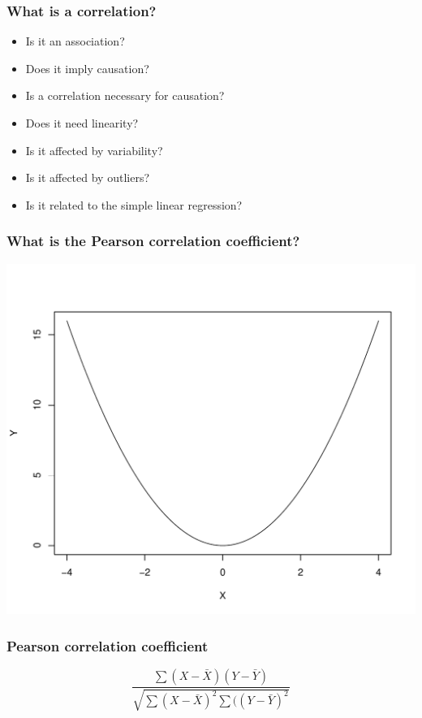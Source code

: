 \documentclass[dvipsnames]{beamer}\usepackage[]{graphicx}\usepackage[]{color}
\makeatletter
\def\maxwidth{ %
  \ifdim\Gin@nat@width>\linewidth
    \linewidth
  \else
    \Gin@nat@width
  \fi
}
\newenvironment{knitrout}{}{} %
\makeatother
\begin{document}
\begin{frame}
\frametitle{What is a correlation?}
\begin{itemize}
  \item Is it an association?
  \item Does it imply causation?
  \item Is a correlation necessary for causation?
  \item Does it need linearity?
  \item Is it affected by variability?
  \item Is it affected by outliers?
  \item Is it related to the simple linear regression?
\end{itemize}
\end{frame}

\begin{frame}
\frametitle{What is the Pearson correlation coefficient?}
\begin{knitrout}
\color{fgcolor}

{\centering \includegraphics[width=\maxwidth]{figure/unnamed-chunk-13-1} 

}



\end{knitrout}
\end{frame}

\begin{frame}
\frametitle{Pearson correlation coefficient}
$$
\frac{\sum(X - \bar{X})(Y - \bar{Y})}{\sqrt{\sum(X - \bar{X})^2\sum((Y - \bar{Y})^2}}
$$
\end{frame}
\end{document}
